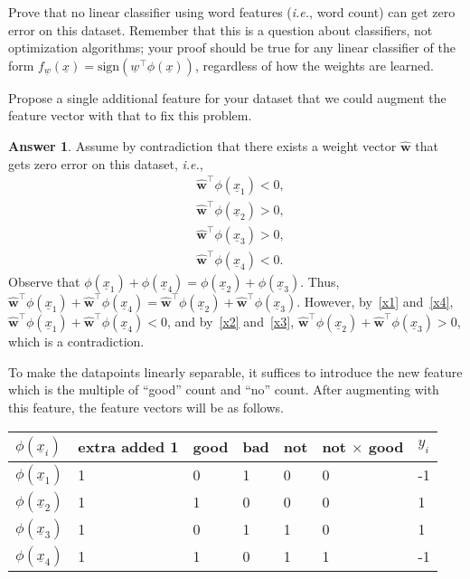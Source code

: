 \documentclass{article}
\theoremstyle{definition}
\newtheorem*{answer}{Answer}
\begin{document}
\begin{question}
\begin{question}
		Prove that no linear classifier using word features (\textit{i.e.}, word count) can get zero error on this dataset. Remember that this is a question about classifiers, not optimization algorithms; your proof should be true for any linear classifier of the form $f_{\underline{w}}(\underline{x})=\text{sign}(\underline{w}^\top\phi(\underline{x}))$, regardless of how the weights are learned.
		
		Propose a single additional feature for your dataset that we could augment the feature vector with that to fix this problem.
		\begin{answer}
			Assume by contradiction that there exists a weight vector $\mathbf{\hat{w}}$ that gets zero error on this dataset, \textit{i.e.},
			\begin{align}
					&\mathbf{\hat{w}}^\top\phi(\underline{x}_1) < 0,\label{x1}\\
					&\mathbf{\hat{w}}^\top\phi(\underline{x}_2) > 0,\label{x2}\\
					&\mathbf{\hat{w}}^\top\phi(\underline{x}_3) > 0,\label{x3}\\
					&\mathbf{\hat{w}}^\top\phi(\underline{x}_4) < 0.\label{x4}
				\end{align}
			 Observe that $\phi(\underline{x}_1) + \phi(\underline{x}_4) = \phi(\underline{x}_2)+\phi(\underline{x}_3)$. Thus, $\mathbf{\hat{w}}^\top\phi(\underline{x}_1) + \mathbf{\hat{w}}^\top\phi(\underline{x}_4) = \mathbf{\hat{w}}^\top\phi(\underline{x}_2)+ \mathbf{\hat{w}}^\top\phi(\underline{x}_3)$. However, by~\eqref{x1} and~\eqref{x4}, $\mathbf{\hat{w}}^\top\phi(\underline{x}_1) + \mathbf{\hat{w}}^\top\phi(\underline{x}_4) < 0$, and by~\eqref{x2} and~\eqref{x3}, $\mathbf{\hat{w}}^\top\phi(\underline{x}_2) + \mathbf{\hat{w}}^\top\phi(\underline{x}_3) > 0$, which is a contradiction.
			
			To make the datapoints linearly separable, it suffices to introduce the new feature which is the multiple of ``good'' count and ``no'' count. After augmenting with this feature, the feature vectors will be as follows.
			
			\begin{tabular}{|l|l|l|l|l|l|l|}
					\hline
					$\phi(\underline{x}_i)$& extra added 1 & good & bad & not & not $\times$ good & $y_i$ \\\hline
					$\phi(\underline{x}_1)$& 1& 0 & 1 & 0 & 0 & -1 \\\hline
					$\phi(\underline{x}_2)$& 1& 1	& 0 & 0 & 0 & 1 \\\hline
					$\phi(\underline{x}_3)$& 1& 0	& 1	& 1 & 0 & 1 \\\hline
					$\phi(\underline{x}_4)$& 1& 1	& 0	& 1 & 1 & -1 \\\hline
				\end{tabular}
			

\end{answer}
\end{question}
\end{question}
\end{document}
